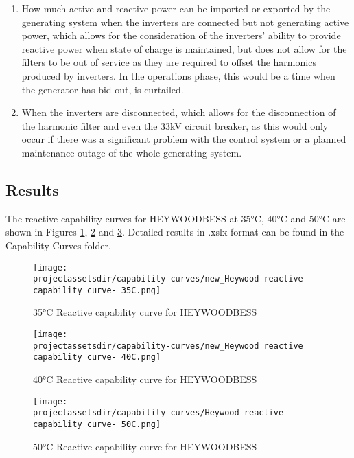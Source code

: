 \documentclass{../grid-link-report}
\newcommand{\projectassetsdir}{../project-assets}
\begin{document}
	\begin{enumerate}[label=(\arabic*)]
		\item How much active and reactive power can be imported or exported by the generating system when the inverters are connected but not generating active power, which allows for the consideration of the inverters’ ability to provide reactive power when state of charge is maintained, but does not allow for the filters to be out of service as they are required to offset the harmonics produced by inverters. In the operations phase, this would be a time when the generator has bid out, is curtailed.
		
		\item When the inverters are disconnected, which allows for the disconnection of the harmonic filter and even the 33kV circuit breaker, as this would only occur if there was a significant problem with the control system or a planned maintenance outage of the whole generating system.
	\end{enumerate}
	\subsection{Results}
		The reactive capability curves for HEYWOODBESS at 35°C, 40°C and 50°C are shown in Figures \ref{fig:pq-curve-35degC}, \ref{fig:pq-curve-40degC} and \ref{fig:pq-curve-50degC}. Detailed results in .xslx format can be found in the Capability Curves folder.
	
	\begin{figure}[H]
		\centering
		\texttt{[image: \\projectassetsdir/capability-curves/new\_Heywood reactive capability curve- 35C.png]}
		\caption{35°C Reactive capability curve for HEYWOODBESS}
		\label{fig:pq-curve-35degC}
	\end{figure}
	
	\begin{figure}[H]
		\centering
		\texttt{[image: \\projectassetsdir/capability-curves/new\_Heywood reactive capability curve- 40C.png]}
		\caption{40°C Reactive capability curve for HEYWOODBESS}
		\label{fig:pq-curve-40degC}
	\end{figure}
	
	\begin{figure}[H]
		\centering
		\texttt{[image: \\projectassetsdir/capability-curves/Heywood reactive capability curve- 50C.png]}
		\caption{50°C Reactive capability curve for HEYWOODBESS}
		\label{fig:pq-curve-50degC}
	\end{figure}
\end{document}

